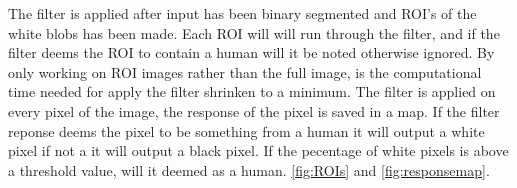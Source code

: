 The filter is applied after input has been binary segmented and  ROI's of the white blobs has been made. Each ROI will will run through the filter, and if the filter deems the ROI to contain a human will it be noted otherwise ignored.  By only working on ROI images rather than the full image, is the computational time needed for apply the filter shrinken to a minimum. The filter is applied on every pixel of the image, the response of the pixel is saved in a map. If the filter reponse deems the pixel to be something from a human it will output a white pixel if not a it will output a black pixel.  If the pecentage of white pixels is above a threshold value, will it deemed as a human. \ref{fig:ROIs} and \ref{fig:responsemap}. 

